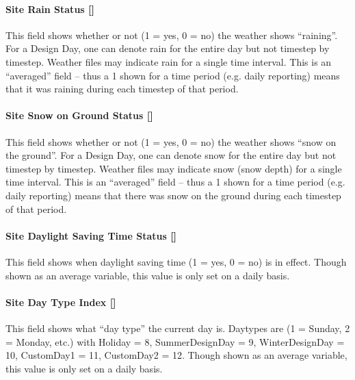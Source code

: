 \paragraph{\texorpdfstring{Site Rain Status {[]}}{Site Rain Status }}\label{site-rain-status}

This field shows whether or not (1 = yes, 0 = no) the weather shows ``raining''. For a Design Day, one can denote rain for the entire day but not timestep by timestep. Weather files may indicate rain for a single time interval. This is an ``averaged'' field -- thus a 1 shown for a time period (e.g. daily reporting) means that it was raining during each timestep of that period.

\paragraph{\texorpdfstring{Site Snow on Ground Status {[]}}{Site Snow on Ground Status }}\label{site-snow-on-ground-status}

This field shows whether or not (1 = yes, 0 = no) the weather shows ``snow on the ground''. For a Design Day, one can denote snow for the entire day but not timestep by timestep. Weather files may indicate snow (snow depth) for a single time interval. This is an ``averaged'' field -- thus a 1 shown for a time period (e.g. daily reporting) means that there was snow on the ground during each timestep of that period.

\paragraph{\texorpdfstring{Site Daylight Saving Time Status {[]}}{Site Daylight Saving Time Status }}\label{site-daylight-saving-time-status}

This field shows when daylight saving time (1 = yes, 0 = no) is in effect. Though shown as an average variable, this value is only set on a daily basis.

\paragraph{\texorpdfstring{Site Day Type Index {[]}}{Site Day Type Index }}\label{site-day-type-index}

This field shows what ``day type'' the current day is. Daytypes are (1 = Sunday, 2 = Monday, etc.) with Holiday = 8, SummerDesignDay = 9, WinterDesignDay = 10, CustomDay1 = 11, CustomDay2 = 12. Though shown as an average variable, this value is only set on a daily basis.

